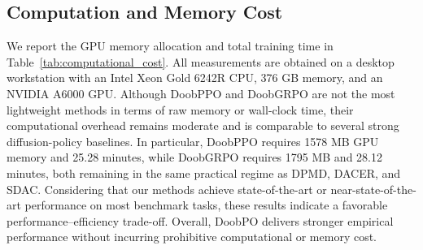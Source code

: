 \subsection{Computation and Memory Cost}

We report the GPU memory allocation and total training time in Table~\ref{tab:computational_cost}.
All measurements are obtained on a desktop workstation with an Intel Xeon Gold 6242R CPU, 376 GB memory, and an NVIDIA A6000 GPU.
Although DoobPPO and DoobGRPO are not the most lightweight methods in terms of raw memory or wall-clock time, their computational overhead remains moderate and is comparable to several strong diffusion-policy baselines.
In particular, DoobPPO requires 1578 MB GPU memory and 25.28 minutes, while DoobGRPO requires 1795 MB and 28.12 minutes, both remaining in the same practical regime as DPMD, DACER, and SDAC.
Considering that our methods achieve state-of-the-art or near-state-of-the-art performance on most benchmark tasks, these results indicate a favorable performance--efficiency trade-off.
Overall, DoobPO delivers stronger empirical performance without incurring prohibitive computational or memory cost.

\begin{table}[h]
\centering
\caption{\small GPU memory allocation and total compute time of 200K
iterations and 1 million environment interactions.}
\vspace{-2mm}
\label{tab:computational_cost}
\end{table}

